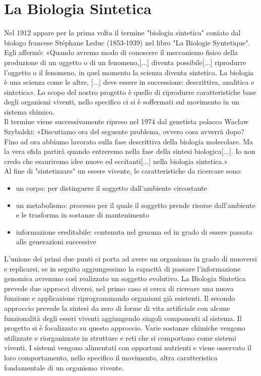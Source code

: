 \section{La Biologia Sintetica}
\label{sec:artificial}
Nel 1912 appare per la prima volta il termine "biologia sintetica" coniato dal biologo francese Stéphane Leduc (1853-1939) nel libro "La Biologie Syntetique". Egli affermò: «Quando avremo modo di conoscere il meccanismo fisico della produzione di un oggetto o di un fenomeno,[...] diventa possibile[...] riprodurre l'oggetto o il fenomeno, in quel momento la scienza diventa sintetica. La biologia è una scienza come le altre, [...] deve essere in successione: descrittiva, analitica e sintetica». 
Lo scopo del nostro progetto è  quello di riprodurre caratteristiche base degli organismi viventi, nello specifico ci si è soffermati sul movimento in un sistema chimico.
\\Il termine viene successivamente ripreso nel 1974 dal genetista polacco Wacław Szybalski: «Discutiamo ora del seguente problema, ovvero cosa avverrà dopo? Fino ad ora abbiamo lavorato sulla fase descrittiva della biologia molecolare. Ma la vera sfida partirà quando entreremo nella fase della sintesi biologica[...]. Io non credo che esauriremo idee nuove ed eccitanti[...] nella biologia sintetica.» \cite{waclaw} 
\\Al fine di "sintetizzare" un essere vivente, le caratteristiche da ricercare sono:
\begin{itemize}
\item un corpo: per distinguere il soggetto dall'ambiente circostante
\item un metabolismo: processo per il quale il soggetto prende risorse dall'ambiente e le trasforma in sostanze di mantenimento
\item informazione ereditabile: contenuta nel genoma ed in grado di essere passata alle generazioni successive
\end{itemize}
L'unione dei primi due punti ci porta ad avere un organismo in grado di muoversi e replicarsi, se in seguito aggiungessimo la capacità di passare l'informazione genomica avremmo così realizzato un soggetto evolutivo. La Biologia Sintetica prevede due approcci diversi, nel primo caso si cerca di ricreare una nuova funzione e applicazione riprogrammando organismi già esistenti. Il secondo approccio prevede la sintesi da zero di forme di vita artificiale con alcune funzionalità degli esseri viventi aggiungendo singoli componenti al sistema. Il progetto si è focalizzato su questo approccio. Varie sostanze chimiche vengono utilizzate e riorganizzate in strutture e reti che si comportano come sistemi viventi. I sistemi vengono alimentati con opportuni nutrienti e viene osservato il loro comportamento, nello specifico il movimento, altra caratteristica fondamentale di un organismo vivente.
\pagebreak
